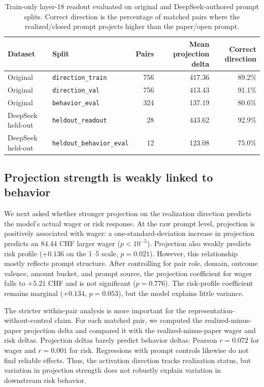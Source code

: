 \documentclass[final]{sparreport}
\begin{document}
\begin{table}[htbp]
  \centering
  \small
  \caption{Train-only layer-18 readout evaluated on original and DeepSeek-authored prompt splits. Correct direction is the percentage of matched pairs where the realized/closed prompt projects higher than the paper/open prompt.}
  \label{tab:heldout-readout}
  \begin{tabular}{llrrr}
    \toprule
    Dataset & Split & Pairs & Mean projection delta & Correct direction \\
    \midrule
    Original & \texttt{direction\_train} & 756 & 417.36 & 89.2\% \\
    Original & \texttt{direction\_val} & 756 & 413.43 & 91.1\% \\
    Original & \texttt{behavior\_eval} & 324 & 137.19 & 80.6\% \\
    DeepSeek held-out & \texttt{heldout\_readout} & 28 & 443.62 & 92.9\% \\
    DeepSeek held-out & \texttt{heldout\_behavior\_eval} & 12 & 123.08 & 75.0\% \\
    \bottomrule
  \end{tabular}
\end{table}

\subsection{Projection strength is weakly linked to behavior}

We next asked whether stronger projection on the realization direction predicts the model's actual wager or risk response. At the raw prompt level, projection is positively associated with wager: a one-standard-deviation increase in projection predicts an 84.44 CHF larger wager (\(p < 10^{-5}\)). Projection also weakly predicts risk profile (\(+0.136\) on the 1--5 scale, \(p = 0.021\)). However, this relationship mostly reflects prompt structure. After controlling for pair role, domain, outcome valence, amount bucket, and prompt source, the projection coefficient for wager falls to \(+5.21\) CHF and is not significant (\(p = 0.776\)). The risk-profile coefficient remains marginal (\(+0.134\), \(p = 0.053\)), but the model explains little variance.

The stricter within-pair analysis is more important for the representation-without-control claim. For each matched pair, we computed the realized-minus-paper projection delta and compared it with the realized-minus-paper wager and risk deltas. Projection deltas barely predict behavior deltas: Pearson \(r = 0.072\) for wager and \(r = 0.001\) for risk. Regressions with prompt controls likewise do not find reliable effects. Thus, the activation direction tracks realization status, but variation in projection strength does not robustly explain variation in downstream risk behavior.
\end{document}
